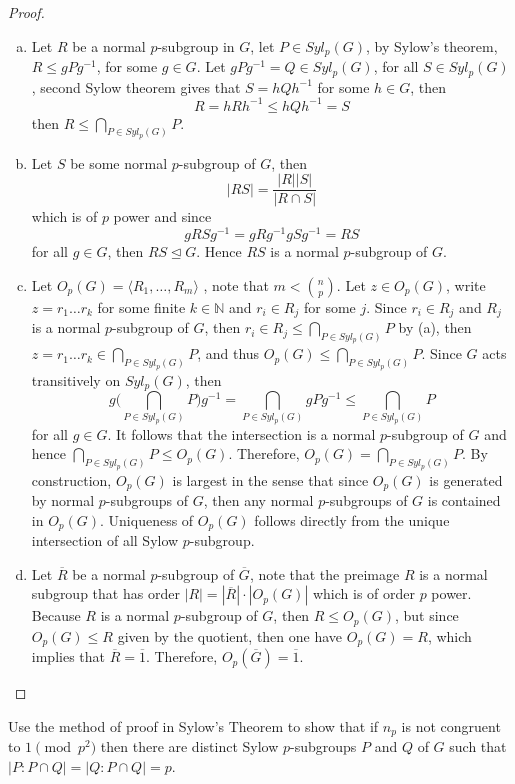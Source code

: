 \documentclass{article}
\newcommand{\N}{\mathbb{N}}
\newenvironment{problem}[2][Problem]{\begin{trivlist}
\item[\hskip \labelsep {\bfseries #1}\hskip \labelsep {\bfseries #2.}]}{\end{trivlist}}
\begin{document}
\begin{proof}
\begin{enumerate}[(a)]
    \item Let $R$ be a normal $p$-subgroup in $G$, let $P\in Syl_p(G)$, by Sylow's theorem, $R\leq gPg^{-1}$, for some $g\in G$. Let $gPg^{-1}=Q\in Syl_p(G)$, for all $S\in Syl_p(G)$, second Sylow theorem gives that $S=hQh^{-1}$ for some $h\in G$, then 
    \[
        R=hRh^{-1}\leq hQh^{-1}=S
    \]
    then \(R\leq \bigcap_{ P\in Syl_p(G)}P\).
    \item Let $S$ be some normal $p$-subgroup of $G$, then 
    \[
        |RS|=\frac{|R||S|}{|R\cap S|}
    \]
    which is of $p$ power and since 
    \[
        gRSg^{-1}=gRg^{-1}gSg^{-1}= RS
    \]
    for all $g\in G$, then $RS\trianglelefteq G$. Hence $RS$ is a normal $p$-subgroup of $G$.
    \item Let $O_p(G)=\langle R_1, \dots , R_m\rangle$ , note that $m<\binom{n}{p}$. Let $z\in O_p(G)$, write $z=r_1\dots r_k$ for some finite $k\in \N$ and $r_i\in R_j$ for some $j$. Since $r_i\in R_j$ and $R_j$ is a normal $p$-subgroup of $G$, then $r_i\in R_j\leq \bigcap_{P\in Syl_p(G)}P$ by (a), then $z=r_1\dots r_k\in \bigcap_{P\in Syl_p(G)}P$, and thus $O_p(G)\leq \bigcap_{P\in Syl_p(G)}P $. Since $G$ acts transitively on $Syl_p(G)$, then 
    \[
        g\bigg(\bigcap_{P\in Syl_p(G)}P\bigg)g^{-1}=\bigcap_{P\in Syl_p(G)}gPg^{-1}\leq \bigcap_{P\in Syl_p(G)}P
    \]
    for all $g\in G$. It follows that the intersection is a normal $p$-subgroup of $G$ and hence $\bigcap_{P\in Syl_p(G)}P\leq O_p(G)$. Therefore, $O_p(G)=\bigcap_{P\in Syl_p(G)}P$. By construction, $O_p(G)$ is largest in the sense that since $O_p(G)$ is generated by normal $p$-subgroups of $G$, then any normal $p$-subgroups of $G$ is contained in $O_p(G)$. Uniqueness of $O_p(G)$ follows directly from the unique intersection of all Sylow $p$-subgroup.
    \item Let $\overline{R}$ be a normal $p$-subgroup of $\overline{G}$, note that the preimage $R$ is a normal subgroup that has order $|R|=|\overline{R}|\cdot |O_p(G)|$ which is of order $p$ power. Because $R$ is a normal $p$-subgroup of $G$, then $R\leq O_p(G)$, but since $O_p(G)\leq R$ given by the quotient, then one have $O_p(G)=R$, which implies that $\overline{R}=\overline{1}$. Therefore, $O_p(\overline{G})=\overline{1}$.
\end{enumerate}
\end{proof}
\begin{problem}{38}
        Use the method of proof in Sylow's Theorem to show that if $n_p$ is not congruent to $1 \pmod{p^2}$ then there are distinct Sylow $p$-subgroups $P$ and $Q$ of $G$ such that $|P : P \cap Q| = |Q : P \cap Q| = p$.
\end{problem}
\end{document}
